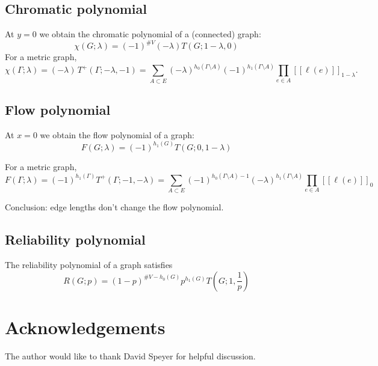 \documentclass{amsart}
\theoremstyle{definition}
\newcommand{\fanalog}[2]{[\![#2]\!]_{#1}}
\begin{document}
\subsection{Chromatic polynomial}
At $y=0$ we obtain the chromatic polynomial of a (connected) graph:
\begin{equation*}
\chi(G; \lambda) = (-1)^{\#V } (-\lambda) T(G; 1-\lambda,0)
\end{equation*}
For a metric graph,
\begin{equation*}
	\chi(\Gamma; \lambda) = (-\lambda)\, T^+(\Gamma; -\lambda, -1) 
	= \sum_{A \subset E} (-\lambda)^{h_0(\Gamma \setminus A)} (-1)^{h_1(\Gamma \setminus A)} 
	\prod_{e \in A} \fanalog{1 - \lambda}{\ell(e)} .
\end{equation*}

\subsection{Flow polynomial}
At $x = 0$ we obtain the flow polynomial of a graph:
\begin{equation*}
F(G; \lambda) = (-1)^{h_1(G)} T(G; 0, 1 - \lambda)
\end{equation*}

For a metric graph,
\begin{equation*}
F(\Gamma; \lambda) = (-1)^{h_1(\Gamma)} T^+(\Gamma; -1, -\lambda) = \sum_{A \subset E} (-1)^{h_0(\Gamma \setminus A) - 1} (-\lambda)^{h_1(\Gamma \setminus A)} \prod_{e \in A} \fanalog{0}{\ell(e)}
\end{equation*}

Conclusion: edge lengths don't change the flow polynomial.

\subsection{Reliability polynomial}
The reliability polynomial of a graph satisfies
\begin{equation*}
R(G; p) = (1 - p)^{\# V - h_0(G)} p^{h_1(G)} T(G; 1, \frac1p )
\end{equation*}

\section*{Acknowledgements}
The author would like to thank David Speyer for helpful discussion.


 

\end{document}
